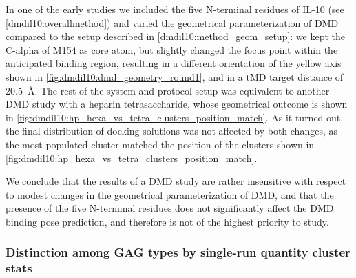 In one of the early studies we included the five N-terminal residues of IL-10
(see \ref{dmdil10:overallmethod}) and varied the geometrical parameterization of
DMD compared to the setup described in \ref{dmdil10:method_geom_setup}: we kept
the C-alpha of M154 as core atom, but slightly changed the focus point within
the anticipated binding region, resulting in a different orientation of the
yellow axis shown in \cref{fig:dmdil10:dmd_geometry_round1}, and in a tMD target
distance of \SI{20.5}{\angstrom}. The rest of the system and protocol setup was
equivalent to another DMD study with a heparin tetrasaccharide, whose
geometrical outcome is shown in
\cref{fig:dmdil10:hp_hexa_vs_tetra_clusters_position_match}. As it turned out,
the final distribution of docking solutions was not affected by both changes, as
the most populated cluster matched the position of the clusters shown in
\cref{fig:dmdil10:hp_hexa_vs_tetra_clusters_position_match}.

We conclude that the results of a DMD study are rather insensitive with respect
to modest changes in the geometrical parameterization of DMD, and that the
presence of the five N-terminal residues does not significantly affect the DMD
binding pose prediction, and therefore is not of the highest priority to study.


\subsubsection{Distinction among GAG types by single-run quantity cluster stats}

